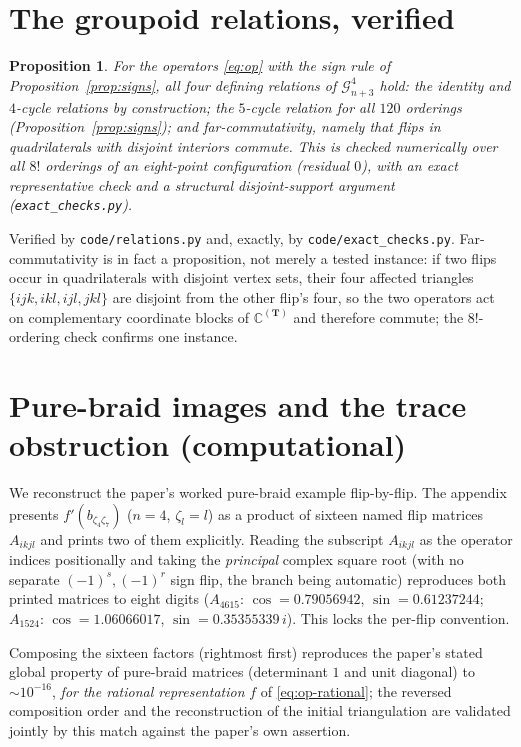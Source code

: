 \documentclass[11pt]{article}
\theoremstyle{plain}
\newtheorem{proposition}[theorem]{Proposition}
\theoremstyle{definition}
\theoremstyle{remark}
\begin{document}
\section{The groupoid relations, verified}
\begin{proposition}\label{prop:relations}
For the operators \eqref{eq:op} with the sign rule of Proposition~\ref{prop:signs}, all four
defining relations of $\mathcal G^{4}_{n+3}$ \cite{manturov-nikonov,fedoseev-manturov-nikonov} hold: the identity and $4$-cycle relations by
construction; the $5$-cycle relation for all $120$ orderings (Proposition~\ref{prop:signs}); and
far-commutativity, namely that flips in quadrilaterals with disjoint interiors commute. This is checked
numerically over all $8!$ orderings of an eight-point configuration (residual $0$), with an exact
representative check and a structural disjoint-support argument (\texttt{exact\_checks.py}).
\end{proposition}
Verified by \texttt{code/relations.py} and, exactly, by \texttt{code/exact\_checks.py}.
Far-commutativity is in fact a proposition, not merely a tested instance: if two flips occur in
quadrilaterals with disjoint vertex sets, their four affected triangles $\{ijk,ikl,ijl,jkl\}$ are
disjoint from the other flip's four, so the two operators act on complementary coordinate blocks of
$\mathbb{C}^{(\mathbf T)}$ and therefore commute; the $8!$-ordering check confirms one instance.

\section{Pure-braid images and the trace obstruction (computational)}\label{sec:braid}
We reconstruct the paper's worked pure-braid example flip-by-flip. The appendix presents
$f'(b_{\zeta_4\zeta_7})$ ($n=4$, $\zeta_l=l$) as a product of sixteen named flip matrices
$A_{ikjl}$ and prints two of them explicitly. Reading the subscript $A_{ikjl}$ as the operator
indices positionally and taking the \emph{principal} complex square root (with no separate
$(-1)^s,(-1)^r$ sign flip, the branch being automatic) reproduces both printed matrices to eight
digits ($A_{4615}$: $\cos=0.79056942$, $\sin=0.61237244$; $A_{1524}$: $\cos=1.06066017$,
$\sin=0.35355339\,i$). This locks the per-flip convention.

Composing the sixteen factors (rightmost first) reproduces the paper's stated global property of
pure-braid matrices (determinant $1$ and unit diagonal) to $\sim 10^{-16}$, \emph{for the
rational representation} $f$ of \eqref{eq:op-rational}; the reversed composition order and the
reconstruction of the initial triangulation are validated jointly by this match against the paper's
own assertion.
\end{document}
